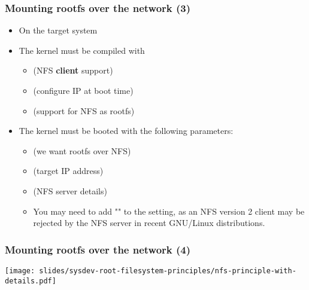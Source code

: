 {\begin{frame}
  \frametitle{Mounting rootfs over the network (3)}
  \begin{itemize}
  \item On the target system
  \item The kernel must be compiled with
    \begin{itemize}
    \item {} (NFS {\bf client} support)
    \item {} (configure IP at boot time)
    \item {} (support for NFS as rootfs)
    \end{itemize}
  \item The kernel must be booted with the following parameters:
    \begin{itemize}
    \item {} (we want rootfs over NFS)
    \item {} (target IP address)
    \item {} (NFS server details)
    \item You may need to add "" to the  setting,
          as an NFS version 2 client may be rejected by the NFS server
	  in recent GNU/Linux distributions.
    \end{itemize}
  \end{itemize}
\end{frame}

\begin{frame}
  \frametitle{Mounting rootfs over the network (4)}
  \begin{center}
    \texttt{[image: slides/sysdev-root-filesystem-principles/nfs-principle-with-details.pdf]}
  \end{center}
\end{frame}
}
